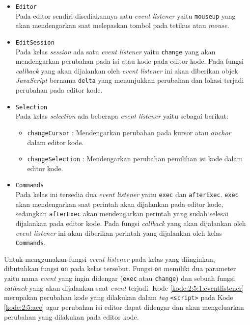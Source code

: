 \begin{itemize}
	\item \verb|Editor| \\
	      Pada editor sendiri disediakannya satu \textit{event listener} yaitu \verb|mouseup| yang akan mendengarkan saat melepaskan tombol pada tetikus atau \textit{mouse}.

	\item \verb|EditSession| \\
	      Pada kelas \textit{session} ada satu \textit{event listener} yaitu \verb|change| yang akan mendengarkan perubahan pada isi atau kode pada editor kode. Pada fungsi \textit{callback} yang akan dijalankan oleh \textit{event listener} ini akan diberikan objek \textit{JavaScript} bernama \verb|delta| yang menunjukkan perubahan dan lokasi terjadi perubahan pada editor kode.

	\item \verb|Selection| \\
	      Pada kelas \textit{selection} ada beberapa \textit{event listener} yaitu sebagai berikut:

	      \begin{itemize}
		      \item \verb|changeCursor| : Mendengarkan perubahan pada kursor atau \textit{anchor} dalam editor kode.
		      \item \verb|changeSelection| : Mendengarkan perubahan pemilihan isi kode dalam editor kode.
	      \end{itemize}

	\item \verb|Commands| \\
	      Pada kelas ini tersedia dua \textit{event listener} yaitu \verb|exec| dan \verb|afterExec|. \verb|exec| akan mendengarkan saat perintah akan dijalankan pada editor kode, sedangkan \verb|afterExec| akan mendengarkan perintah yang sudah selesai dijalankan pada editor kode. Pada fungsi \textit{callback} yang akan dijalankan oleh \textit{event listener} ini akan diberikan perintah yang dijalankan oleh kelas \verb|Commands|.
\end{itemize}

Untuk menggunakan fungsi \textit{event listener} pada kelas yang diinginkan, dibutuhkan fungsi \verb|on| pada kelas tersebut. Fungsi \verb|on| memiliki dua parameter yaitu nama \textit{event} yang ingin didengar (\verb|exec| atau \verb|change|) dan sebuah fungsi \textit{callback} yang akan dijalankan saat \textit{event} terjadi. Kode \ref{kode:2:5:1:eventlistener} merupakan perubahan kode yang dilakukan dalam \textit{tag} \verb|<script>| pada Kode \ref{kode:2:5:ace} agar perubahan isi editor dapat didengar dan akan mengeluarkan perubahan yang dilakukan pada editor kode.

